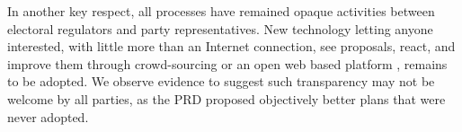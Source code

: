 \documentclass[letter,12pt]{article}
\begin{document}



In another key respect, all processes have remained opaque activities between electoral regulators and party representatives. New technology letting anyone interested, with little more than an Internet connection, see proposals, react, and improve them through crowd-sourcing or an open web based platform \citep{altman.mcdonald2011bard,Trelles.2015}, remains to be adopted. We observe evidence to suggest such transparency may not be welcome by all parties, as the PRD proposed objectively better plans that were never adopted.



\end{document}
